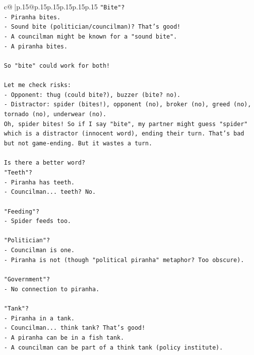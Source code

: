 \documentclass{article}
\begin{document}
{\begin{supertabular}{c@{$\;$}|p{.15\linewidth}@{}p{.15\linewidth}p{.15\linewidth}p{.15\linewidth}p{.15\linewidth}p{.15\linewidth}}
{{{\texttt{"Bite"?} \\
\texttt{{-} Piranha bites.} \\
\texttt{{-} Sound bite (politician/councilman)? That's good!} \\
\texttt{{-} A councilman might be known for a "sound bite".} \\
\texttt{{-} A piranha bites.} \\
\\ 
\texttt{So "bite" could work for both!} \\
\\ 
\texttt{Let me check risks:} \\
\texttt{{-} Opponent: thug (could bite?), buzzer (bite? no).} \\
\texttt{{-} Distractor: spider (bites!), opponent (no), broker (no), greed (no), tornado (no), underwear (no).} \\
\texttt{Oh, spider bites! So if I say "bite", my partner might guess "spider" which is a distractor (innocent word), ending their turn. That's bad but not game{-}ending. But it wastes a turn.} \\
\\ 
\texttt{Is there a better word?} \\
\texttt{"Teeth"?} \\
\texttt{{-} Piranha has teeth.} \\
\texttt{{-} Councilman... teeth? No.} \\
\\ 
\texttt{"Feeding"?} \\
\texttt{{-} Spider feeds too.} \\
\\ 
\texttt{"Politician"?} \\
\texttt{{-} Councilman is one.} \\
\texttt{{-} Piranha is not (though "political piranha" metaphor? Too obscure).} \\
\\ 
\texttt{"Government"?} \\
\texttt{{-} No connection to piranha.} \\
\\ 
\texttt{"Tank"?} \\
\texttt{{-} Piranha in a tank.} \\
\texttt{{-} Councilman... think tank? That's good!} \\
\texttt{{-} A piranha can be in a fish tank.} \\
\texttt{{-} A councilman can be part of a think tank (policy institute).} \\
}}}
\end{supertabular}}
\end{document}
